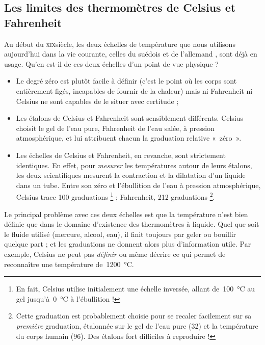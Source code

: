 	\subsection{Les limites des thermomètres de Celsius et Fahrenheit}
	\label{thermometres_celsius_fahrenheit}
	
		Au début du \textsc{xix}\ieme siècle, les deux échelles de température que nous utilisons aujourd’hui dans la vie courante, celles du suédois  et de l’allemand , sont déjà en usage. Qu’en est-il de ces deux échelles d’un point de vue physique ?
			
		\begin{itemize}
			\item Le degré zéro est plutôt facile à définir (c’est le point où les corps sont entièrement figés, incapables de fournir de la chaleur) mais ni Fahrenheit ni Celsius ne sont capables de le situer avec certitude ;
			\item Les étalons de Celsius et Fahrenheit sont sensiblement différents. Celsius choisit le gel de l’eau pure, Fahrenheit de l’eau salée, à pression atmosphérique, et lui attribuent chacun la graduation relative «~zéro~».
			\item Les échelles de Celsius et Fahrenheit, en revanche, sont strictement identiques. En effet, pour \emph{mesurer} les températures autour de leurs étalons, les deux scientifiques mesurent la contraction et la dilatation d’un liquide dans un tube. Entre son zéro et l’ébullition de l’eau à pression atmosphérique, Celsius trace 100 graduations%
			\footnote{En fait, Celsius utilise initialement une échelle inversée, allant de~\SI{100}{\celsius} au gel jusqu’à~\SI{0}{\celsius} à l’ébullition !} ; Fahrenheit, 212 graduations%
			\footnote{Cette graduation est probablement choisie pour se recaler facilement sur sa \emph{première} graduation, étalonnée sur le gel de l’eau pure (32) et la température du corps humain (96). Des étalons fort difficiles à reproduire !}.
		\end{itemize}
		
		Le principal problème avec ces deux échelles est que la température n’est bien définie que dans le domaine d’existence des thermomètres à liquide. Quel que soit le fluide utilisé (mercure, alcool, eau), il finit toujours par geler ou bouillir quelque part ; et les graduations ne donnent alors plus d’information utile. Par exemple, Celsius ne peut pas \emph{définir} ou même décrire ce qui permet de reconnaître une température de~\SI{1200}{\celsius}.
		
